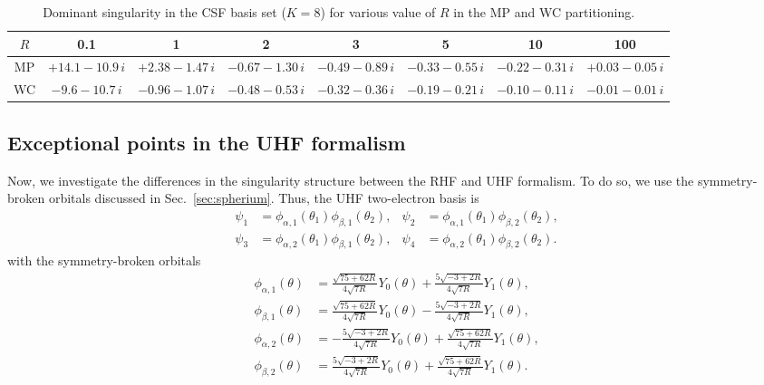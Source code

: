 \documentclass[11pt,a4paper]{article}
\begin{document}
\begin{table}
\centering
\footnotesize
\caption{Dominant singularity in the CSF basis set ($K=8$) for various value of $R$ in the MP and WC partitioning.}
\begin{tabular}{cccccccc}
\hline
\hline
$R$ & 0.1 & 1 & 2 & 3 & 5 & 10 & 100 \\
\hline
MP & $+14.1-10.9\,i$ & $+2.38-1.47\,i$ & $-0.67-1.30\,i$ & $-0.49-0.89\,i$ & $-0.33-0.55\,i$ & $-0.22-0.31\,i$ & $+0.03-0.05\,i$ \\
WC & $-9.6-10.7\,i$ & $-0.96-1.07\,i$ & $-0.48-0.53\,i$ & $-0.32-0.36\,i$ & $-0.19-0.21\,i$ & $-0.10-0.11\,i$ & $-0.01-0.01\,i$ \\
\hline
\hline
\end{tabular}
\label{tab:SingAlpha}
\end{table}

\subsection{Exceptional points in the UHF formalism}\label{sec:uhfSing}

Now, we investigate the differences in the singularity structure between the RHF and UHF formalism. To do so, we use the symmetry-broken orbitals discussed in Sec.~\ref{sec:spherium}. Thus, the UHF two-electron basis is
\begin{align}\label{eq:uhfbasis}
 \psi_1 & =\phi_{\alpha,1}(\theta_1)\phi_{\beta,1}(\theta_2),
 & 
 \psi_2 & =\phi_{\alpha,1}(\theta_1)\phi_{\beta,2}(\theta_2),\\
 \psi_3 & =\phi_{\alpha,2}(\theta_1)\phi_{\beta,1}(\theta_2),
 & 
 \psi_4 & =\phi_{\alpha,2}(\theta_1)\phi_{\beta,2}(\theta_2).
\end{align}
with the symmetry-broken orbitals
\begin{subequations}
\begin{align}\label{eq:uhforbitals}
 	\phi_{\alpha,1}(\theta) 
 		& =\frac{\sqrt{75+62R}}{4\sqrt{7R}} Y_{0}(\theta)
 		+ \frac{5\sqrt{-3+2R}}{4\sqrt{7R}} Y_{1}(\theta),
 \\ 
 	\phi_{\beta,1}(\theta) 
		& =\frac{\sqrt{75+62R}}{4\sqrt{7R}} Y_{0}(\theta)
		- \frac{5\sqrt{-3+2R}}{4\sqrt{7R}} Y_{1}(\theta),
 \\
	 \phi_{\alpha,2}(\theta) 
	 & = - \frac{5\sqrt{-3+2R}}{4\sqrt{7R}} Y_{0}(\theta)
	  + \frac{\sqrt{75+62R}}{4\sqrt{7R}} Y_{1}(\theta),
 \\
	 \phi_{\beta,2}(\theta) 
	 & =\frac{5\sqrt{-3+2R}}{4\sqrt{7R}} Y_{0}(\theta)
	 +\frac{\sqrt{75+62R}}{4\sqrt{7R}} Y_{1}(\theta).
\end{align}
\end{subequations}
\end{document}
